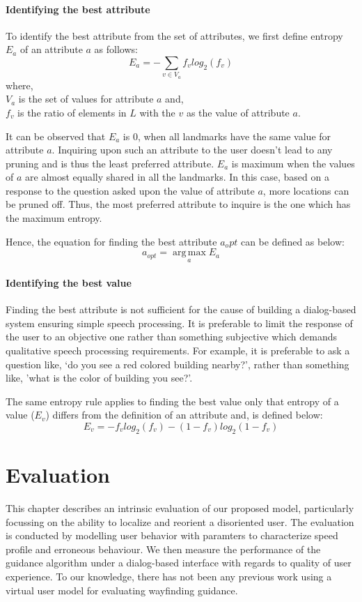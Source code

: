 \documentclass{iitkthesis}
\begin{document}
\subsubsection*{Identifying the best attribute}
To identify the best attribute from the set of attributes, we first define entropy $E_a$ of an attribute $a$ as follows:
\[\displaystyle E_{a} = - \sum_{v \in V_{a}}f_vlog_{2}{(f_v)}\] 
where, \\
$V_{a}$ is the set of values for attribute $a$ and, \\
$f_{v}$ is the ratio of elements in $L$ with the $v$ as the value of attribute $a$.

It can be observed that $E_a$ is 0, when all landmarks have the same value for attribute $a$. Inquiring upon such an attribute to the user doesn't lead to any pruning and is thus the least preferred attribute. $E_a$ is maximum when the values of $a$ are almost equally shared in all the landmarks. In this case, based on a response to the question asked upon the value of attribute $a$, more locations can be pruned off. Thus, the most preferred attribute to inquire is the one which has the maximum entropy.

Hence, the equation for finding the best attribute $a_opt$ can be defined as below:
\[\displaystyle a_{opt} = \operatorname*{arg\,max}_a E_a\] 

\subsubsection*{Identifying the best value}
Finding the best attribute is not sufficient for the cause of building a dialog-based system ensuring simple speech processing. It is preferable to limit the response of the user to an objective one rather than something subjective which demands qualitative speech processing requirements. For example, it is preferable to ask a question like, `do you see a red colored building nearby?', rather than something like, 'what is the color of building you see?'.

The same entropy rule applies to finding the best value only that entropy of a value ($E_v$) differs from the definition of an attribute and, is defined below:
\[\displaystyle E_{v} = - f_vlog_{2}{(f_v)} - (1-f_v)log_{2}{(1-f_v)}\] 

 \chapter{Evaluation}
This chapter describes an intrinsic evaluation of our proposed model, particularly focussing on the ability to localize and reorient a disoriented user. The evaluation is conducted by modelling user behavior with paramters to characterize speed profile and erroneous behaviour. We then measure the performance of the guidance algorithm under a dialog-based interface with regards to quality of user experience. To our knowledge, there has not been any previous work using a virtual user model for evaluating wayfinding guidance. 
 
\end{document}
